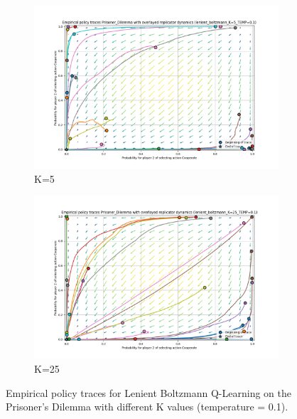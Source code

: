 \documentclass[12pt,a4paper, onecolumn]{exam}
\begin{document}
\begin{appendices}
\begin{figure}[H]
\begin{subfigure}{0.44\textwidth}
            \includegraphics[width=\linewidth]{plots/replicator_trajectoreis_Prisoner_Dilemma_lenient_boltzmann_K=5_TEMP=0.1.png}
            \caption{K=5}
        \end{subfigure}
        \hfill
        \begin{subfigure}{0.44\textwidth}
            \centering
            \includegraphics[width=\linewidth]{plots/replicator_trajectoreis_Prisoner_Dilemma_lenient_boltzmann_K=25_TEMP=0.1.png}
            \caption{K=25}
        \end{subfigure}
        \caption{Empirical policy traces for Lenient Boltzmann Q-Learning on the Prisoner's Dilemma with different K values (temperature = 0.1).}
        \label{fig:app_prisoner_k_values}
    \end{figure}


\end{appendices}
\end{document}
